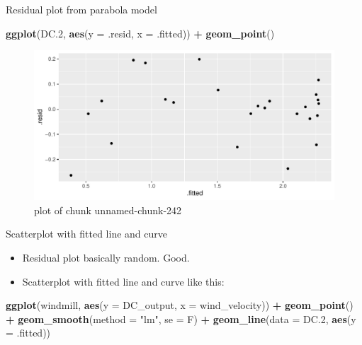 \documentclass[ignorenonframetext,]{beamer}
\newenvironment{Shaded}{\begin{snugshade}}{\end{snugshade}}
\newcommand{\DataTypeTok}[1]{\textcolor[rgb]{0.13,0.29,0.53}{#1}}
\newcommand{\FloatTok}[1]{\textcolor[rgb]{0.00,0.00,0.81}{#1}}
\newcommand{\KeywordTok}[1]{\textcolor[rgb]{0.13,0.29,0.53}{\textbf{#1}}}
\newcommand{\NormalTok}[1]{#1}
\newcommand{\OperatorTok}[1]{\textcolor[rgb]{0.81,0.36,0.00}{\textbf{#1}}}
\newcommand{\StringTok}[1]{\textcolor[rgb]{0.31,0.60,0.02}{#1}}
\providecommand{\tightlist}{%
  \setlength{\itemsep}{0pt}\setlength{\parskip}{0pt}}
\begin{document}
\begin{frame}[fragile]{Residual plot from parabola model}
\protect\hypertarget{residual-plot-from-parabola-model}{}

\begin{Shaded}
\begin{Highlighting}[]
\KeywordTok{ggplot}\NormalTok{(DC}\FloatTok{.2}\NormalTok{, }\KeywordTok{aes}\NormalTok{(}\DataTypeTok{y =}\NormalTok{ .resid, }\DataTypeTok{x =}\NormalTok{ .fitted)) }\OperatorTok{+}
\StringTok{  }\KeywordTok{geom_point}\NormalTok{()}
\end{Highlighting}
\end{Shaded}

\begin{figure}
\centering
\includegraphics{figure/unnamed-chunk-242-1.pdf}
\caption{plot of chunk unnamed-chunk-242}
\end{figure}

\end{frame}

\begin{frame}[fragile]{Scatterplot with fitted line and curve}
\protect\hypertarget{scatterplot-with-fitted-line-and-curve}{}

\begin{itemize}
\tightlist
\item
  Residual plot basically random. Good.
\item
  Scatterplot with fitted line and curve like this:
\end{itemize}

\begin{Shaded}
\begin{Highlighting}[]
\KeywordTok{ggplot}\NormalTok{(windmill, }\KeywordTok{aes}\NormalTok{(}\DataTypeTok{y =}\NormalTok{ DC_output, }\DataTypeTok{x =}\NormalTok{ wind_velocity)) }\OperatorTok{+}
\StringTok{  }\KeywordTok{geom_point}\NormalTok{() }\OperatorTok{+}\StringTok{ }\KeywordTok{geom_smooth}\NormalTok{(}\DataTypeTok{method =} \StringTok{"lm"}\NormalTok{, }\DataTypeTok{se =}\NormalTok{ F) }\OperatorTok{+}
\StringTok{  }\KeywordTok{geom_line}\NormalTok{(}\DataTypeTok{data =}\NormalTok{ DC}\FloatTok{.2}\NormalTok{, }\KeywordTok{aes}\NormalTok{(}\DataTypeTok{y =}\NormalTok{ .fitted))}
\end{Highlighting}
\end{Shaded}

\end{frame}
\end{document}
